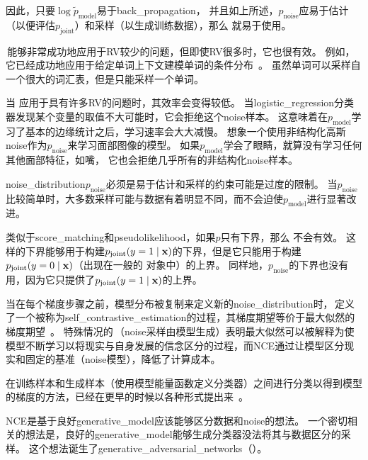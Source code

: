 因此，只要$\log \tilde{p}_{\text{model}}$易于\gls{back_propagation}，
并且如上所述，$p_{\text{noise}}$应易于估计（以便评估$p_{\text{joint}}$）和采样（以生成训练数据），那么\,\,就易于使用。


\,能够非常成功地应用于\gls{RV}较少的问题，但即使\gls{RV}很多时，它也很有效。
例如，它已经成功地应用于给定单词上下文建模单词的条件分布~\citep{Mnih2013}。
虽然单词可以采样自一个很大的词汇表，但是只能采样一个单词。


当\,\,应用于具有许多\gls{RV}的问题时，其效率会变得较低。
当\gls{logistic_regression}分类器发现某个变量的取值不大可能时，它会拒绝这个\gls{noise}样本。
这意味着在$p_{\text{model}}$学习了基本的边缘统计之后，学习速率会大大减慢。
想象一个使用非结构化高斯\gls{noise}作为$p_{\text{noise}}$来学习面部图像的模型。
如果$p_{\text{model}}$学会了眼睛，就算没有学习任何其他面部特征，如嘴， 它也会拒绝几乎所有的非结构化\gls{noise}样本。


\gls{noise_distribution}$p_{\text{noise}}$必须是易于估计和采样的约束可能是过度的限制。
当$p_{\text{noise}}$比较简单时，大多数采样可能与数据有着明显不同，而不会迫使$p_{\text{model}}$进行显著改进。


类似于\gls{score_matching}和\gls{pseudolikelihood}，如果$p$只有下界，那么\,\,不会有效。
这样的下界能够用于构建$p_{\text{joint}}( y = 1 \mid \mathbf{x})$的下界，但是它只能用于构建$p_{\text{joint}}(y = 0 \mid \mathbf{x})$（出现在一般的\,\,对象中）的上界。
同样地，$p_{\text{noise}}$的下界也没有用，因为它只提供了$p_{\text{joint}}( y = 1 \mid \mathbf{x})$的上界。


当在每个梯度步骤之前，模型分布被复制来定义新的\gls{noise_distribution}时，\,定义了一个被称为\gls{self_contrastive_estimation}的过程，其梯度期望等价于最大似然的梯度期望~\citep{Goodfellow-ICLR2015}。
特殊情况的\,（\gls{noise}采样由模型生成）表明最大似然可以被解释为使模型不断学习以将现实与自身发展的信念区分的过程，而\gls{NCE}通过让模型区分现实和固定的基准（\gls{noise}模型），降低了计算成本。


在训练样本和生成样本（使用模型能量函数定义分类器）之间进行分类以得到模型的梯度的方法，已经在更早的时候以各种形式提出来~\citep{Welling2003b,Bengio-2009-book}。


\gls{NCE}是基于良好\gls{generative_model}应该能够区分数据和\gls{noise}的想法。
一个密切相关的想法是，良好的\gls{generative_model}能够生成分类器没法将其与数据区分的采样。
这个想法诞生了\gls{generative_adversarial_networks}（）。



